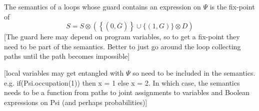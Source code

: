 \documentclass{article}
\begin{document}
The semantics of a loops whose guard contains an expression on $\Psi$ is the fix-point of 
\[
S = S \otimes \left( \left\{(0,\overline{G})\right\} \cup  \{(1,G)\}\otimes D \right) 
\]
[The guard here may depend on program variables, so to get a fix-point they need to be part of the semantics. Better to just go around the loop collecting paths until the path becomes impossible]

[local variables may get entangled with $\Psi$ so need to be included in the semantics. e.g. if(Psi.occupation(1)) then x = 1 else x = 2. In which case, the semantics needs to be a function from paths to joint assignments to variables and Boolean expressions on Psi (and perhaps probabilities)]


%
% 


\end{document}
